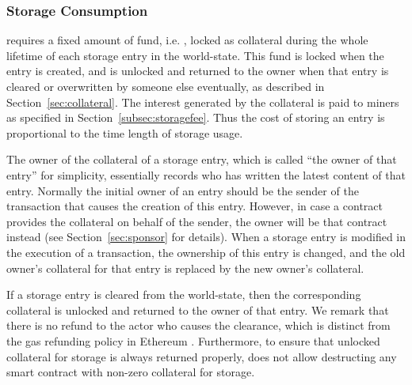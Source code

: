 \subsubsection{Storage Consumption}
	\label{subsec:storage consumption}

	\name requires a fixed amount of fund, i.e. \sunitprice, locked as collateral during the whole lifetime of each \sunitsize storage entry in the world-state.
	This fund is locked when the entry is created, and is unlocked and returned to the owner when that entry is cleared or overwritten by someone else eventually, as described in Section~\ref{sec:collateral}.
	The interest generated by the collateral is paid to miners as specified in Section~\ref{subsec:storagefee}. 
	Thus the cost of storing an entry  
	is proportional to the time length of storage usage.

	
	The owner of the collateral of a storage entry, 
	which is called ``the owner of that entry'' for simplicity, 
	essentially records who has written the latest content of that entry.
	Normally the initial owner of an entry should be the sender of the transaction that causes the creation of this entry. 
	However, in case a contract provides the collateral on behalf of the sender, the owner will be that contract instead (see Section~\ref{sec:sponsor} for details).
	When a storage entry is modified in the execution of a transaction,
	the ownership of this entry is changed,
	and the old owner's collateral for that entry is replaced by the new owner's collateral.


	If a storage entry is cleared from the world-state,
	then the corresponding collateral is unlocked and returned to the owner of that entry.
	We remark that there is no refund to the actor who causes the clearance, 
	which is distinct from the gas refunding policy in Ethereum \cite{ETH_yellow}.
	Furthermore, to ensure that unlocked collateral for storage is always returned properly, 
	\name does not allow destructing any smart contract with non-zero collateral for storage.



